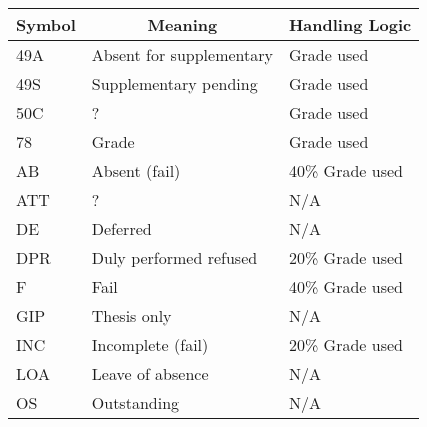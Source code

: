 \begin{table}[H]
    \centering
    \label{PercentTreatment}
    \begin{tabular}{|l|l|l|}
        \hline
        \multicolumn{1}{|c|}{\textbf{Symbol}} & \multicolumn{1}{c|}{\textbf{Meaning}} & \multicolumn{1}{c|}{\textbf{Handling Logic}} \\
        \hline
        49A                                   & Absent for supplementary              & Grade used                                   \\
        49S                                   & Supplementary pending                 & Grade used                                   \\
        50C                                   & ?                                     & Grade used                                   \\
        78                                    & Grade                                 & Grade used                                   \\
        AB                                    & Absent (fail)                         & 40\% Grade used                              \\
        ATT                                   & ?                                     & N/A                                          \\
        DE                                    & Deferred                              & N/A                                          \\
        DPR                                   & Duly performed refused                & 20\% Grade used                              \\
        F                                     & Fail                                  & 40\% Grade used                              \\
        GIP                                   & Thesis only                           & N/A                                          \\
        INC                                   & Incomplete (fail)                     & 20\% Grade used                              \\
        LOA                                   & Leave of absence                      & N/A                                          \\
        OS                                    & Outstanding                           & N/A                                          \\

\end{tabular}
\end{table}
